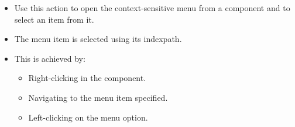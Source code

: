 
\begin{itemize}
\item Use this action to open the context-sensitive menu from a  component and to select an item from it.
\item The menu item is selected using its indexpath. 
\item This is achieved by:
\begin{itemize}
\item Right-clicking in the component.
\item Navigating to the menu item specified.
\item Left-clicking on the menu option.  
\end{itemize}

\end{itemize}
